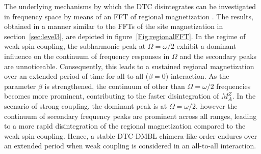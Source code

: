 \documentclass[12pt]{iopart}
\begin{document}
The underlying mechanisms by which the DTC disintegrates can be investigated in frequency space by means of an FFT of regional magnetization . The results, obtained in a manner similar to the FFTs of the site magnetization in section~\ref{sec:level3}, are depicted in figure~\ref{Fig:regionalFFT}. In the regime of weak spin coupling, the subharmonic peak at $\Omega=\omega/2$ exhibit a dominant influence on the continuum of frequency responses in $\Omega$ and the secondary peaks are unnoticeable. Consequently, this leads to a sustained regional magnetization over an extended period of time for all-to-all ($\beta = 0$) interaction. As the parameter $\beta$ is strengthened,  the continuum of other than $\Omega = \omega/2$ frequencies becomes more prominent, contributing to the faster disintegration of $M^Z_A$. In the scenario of strong coupling, the dominant peak is at $\Omega = \omega/2$, however the continuum of secondary frequency peaks are prominent across all ranges, leading to a more rapid disintegration of the regional magnetization compared to the weak spin-coupling. Hence, a stable DTC-DMBL chimera-like order endures over an extended period when weak coupling is considered in an all-to-all interaction.

	
	
\end{document}
